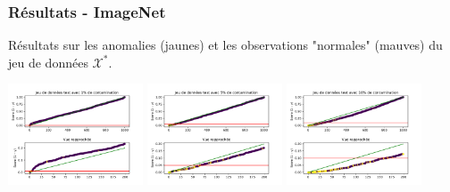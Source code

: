 \documentclass{beamer}
\begin{document}
	\begin{frame}
		\frametitle{Résultats -  ImageNet}
		
		Résultats sur les anomalies (jaunes) et les observations "normales" (mauves) du jeu de données $\mathcal{X^*}$.
		
		\vspace{0.5cm}
		
		\centering
		\includegraphics[width=4cm]{../rapports/images/images_davae/pvalues_scenario_cars_moins}
		\includegraphics[width=4cm]{../rapports/images/images_davae/pvalues_scenario_cars_egal}
		\includegraphics[width=4cm]{../rapports/images/images_davae/pvalues_scenario_cars_plus}
		
	\end{frame}
\end{document}
